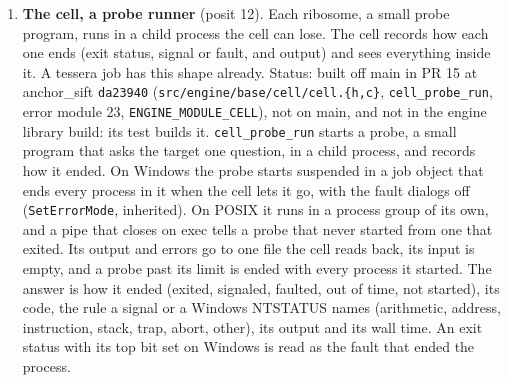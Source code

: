 \begin{enumerate}
\begin{itemize}
\begin{enumerate}
\begin{itemize}
\item \textbf{Prior art, cited from knowledge.} GCC's machine descriptions, each target's instruction patterns held as data the compiler's core reads. LLVM's TableGen target descriptions and its legalization, which expands an operation a target lacks into ones it has (an add with carry out becomes an add and \texttt{sltu} on RISC-V). C. W. Fraser and D. R. Hanson, \emph{A Retargetable C Compiler: Design and Implementation} (Addison-Wesley, 1995), lcc, whose back ends are tree grammars compiled by lburg. N. Ramsey and M. F. Fernández, “Specifying representations of machine instructions”, ACM TOPLAS 19 (1997) 492–524, the New Jersey Machine-Code Toolkit. For the memory models: L. Lamport, “How to make a multiprocessor computer that correctly executes multiprocess programs”, IEEE Transactions on Computers C-28 (1979) 690–691; P. Sewell, S. Sarkar, S. Owens, F. Zappa Nardelli and M. O. Myreen, “x86-TSO: a rigorous and usable programmer's model for x86 multiprocessors”, Communications of the ACM 53 (2010) 89–97; J. Alglave, L. Maranget and M. Tautschnig, “Herding cats: modelling, simulation, testing, and data mining for weak memory”, ACM TOPLAS 36 (2014), article 7; the RISC-V Instruction Set Manual, Volume I, its RVWMO memory model; D. Lustig, S. Sahasrabuddhe and O. Giroux, “A formal analysis of the NVIDIA PTX memory consistency model”, ASPLOS 2019.
\end{itemize}
\item \textbf{The cell, a probe runner} (posit 12). Each ribosome, a small probe program, runs in a child process the cell can lose. The cell records how each one ends (exit status, signal or fault, and output) and sees everything inside it. A tessera job has this shape already. Status: built off main in PR 15 at anchor\_\allowbreak{}sift \texttt{da23940} (\texttt{src/\allowbreak{}engine/\allowbreak{}base/\allowbreak{}cell/\allowbreak{}cell.\allowbreak{}\{h,c\}}, \texttt{cell\_\allowbreak{}probe\_\allowbreak{}run}, error module 23, \texttt{ENGINE\_\allowbreak{}MODULE\_\allowbreak{}CELL}), not on main, and not in the engine library build: its test builds it. \texttt{cell\_\allowbreak{}probe\_\allowbreak{}run} starts a probe, a small program that asks the target one question, in a child process, and records how it ended. On Windows the probe starts suspended in a job object that ends every process in it when the cell lets it go, with the fault dialogs off (\texttt{SetErrorMode}, inherited). On POSIX it runs in a process group of its own, and a pipe that closes on exec tells a probe that never started from one that exited. Its output and errors go to one file the cell reads back, its input is empty, and a probe past its limit is ended with every process it started. The answer is how it ended (exited, signaled, faulted, out of time, not started), its code, the rule a signal or a Windows NTSTATUS names (arithmetic, address, instruction, stack, trap, abort, other), its output and its wall time. An exit status with its top bit set on Windows is read as the fault that ended the process.


\end{enumerate}
\end{itemize}
\end{enumerate}
